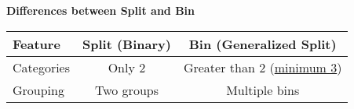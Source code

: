 \highspace
\begin{flushleft}
    \textcolor{Green3}{ \textbf{Differences between Split and Bin}}
\end{flushleft}

\begin{table}[!htp]
    \centering
    \begin{tabular}{@{} l | c c @{}}
        \toprule
        \textbf{Feature} & \textbf{Split (Binary)} & \textbf{Bin (Generalized Split)} \\
        \midrule
        Categories & Only 2 & Greater than 2 (\underline{minimum 3}) \\
        Grouping & Two groups & Multiple bins \\
        \bottomrule
    \end{tabular}
\end{table}